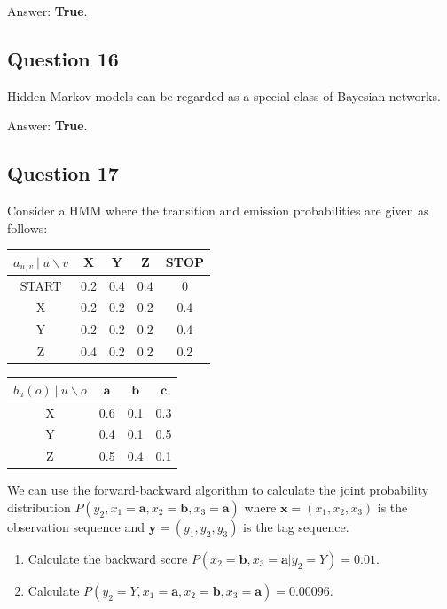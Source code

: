 \documentclass[11pt,fancychapters]{article}
\begin{document}
Answer: \textbf{True}.

\subsection*{Question 16 {\normalfont{[1 point]}}}

Hidden Markov models can be regarded as a special class of Bayesian networks.

Answer: \textbf{True}.

\subsection*{Question 17 {\normalfont{[12 points]}}}

Consider a HMM where the transition and emission probabilities are given as follows:

\begin{table}[h!]
	\centering
	\begin{tabular}{| c | c | c | c | c |}
		\hline
		$a_{u, v} ~ | ~ u \backslash v$ & X & Y & Z & STOP \\
		\hline
		START & 0.2 & 0.4 & 0.4 & 0 \\
		\hline
		X & 0.2 & 0.2 & 0.2 & 0.4 \\
		\hline
		Y & 0.2 & 0.2 & 0.2 & 0.4 \\
		\hline
		Z & 0.4 & 0.2 & 0.2 & 0.2 \\ 
		\hline
	\end{tabular}
\end{table}

\begin{table}[h!]
	\centering
	\begin{tabular}{| c | c | c | c |}
		\hline
		$b_u(o) ~ | ~ u \backslash o$ & $\textbf{a}$ & $\textbf{b}$ & $\textbf{c}$ \\
		\hline
		X & 0.6 & 0.1 & 0.3 \\
		\hline
		Y & 0.4 & 0.1 & 0.5 \\
		\hline
		Z & 0.5 & 0.4 & 0.1 \\
		\hline
	\end{tabular}
\end{table}

We can use the forward-backward algorithm to calculate the joint probability distribution $P(y_2, x_1 = \textbf{a}, x_2 = \textbf{b}, x_3 = \textbf{a})$ where $\textbf{x} = (x_1, x_2, x_3)$ is the observation sequence and $\textbf{y} = (y_1, y_2, y_3)$ is the tag sequence.

\begin{enumerate}[label=\textbf{\arabic*.}]
	\item Calculate the backward score $P(x_2 = \textbf{b}, x_3 = \textbf{a} | y_2 = Y) = 0.01$.
	\item Calculate $P(y_2 = Y, x_1 = \textbf{a}, x_2 = \textbf{b}, x_3 = \textbf{a}) = 0.00096$.
\end{enumerate}
\end{document}

